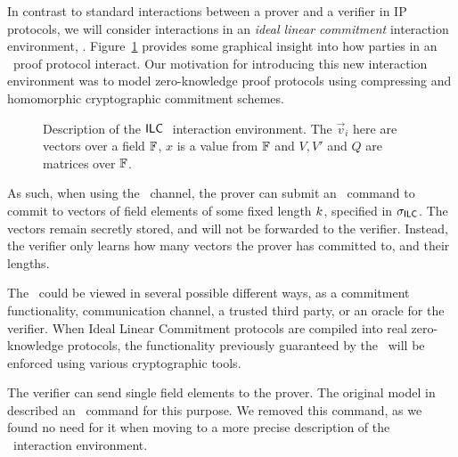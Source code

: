 In contrast to standard interactions between a prover and a verifier in IP protocols, we will consider interactions in an \emph{ideal linear commitment} interaction environment, \ILC. Figure~\ref{ILCSyntaxFigure11} provides some graphical insight into how parties in an \ILC\ proof protocol interact. Our motivation for introducing this new interaction environment was to model zero-knowledge proof protocols using compressing and homomorphic cryptographic commitment schemes.

\begin{figure}[htb]
\caption{Description of the $\mathsf{ILC}~$ interaction environment. The $\vec{v}_i$ here are vectors over a field $\mathbb{F}$, $x$ is a value from $\mathbb{F}$ and $V, V'$ and $Q$ are matrices over $\mathbb{F}$.}\label{ILCSyntaxFigure11}
\end{figure}

As such, when using the \ILC\ channel, the prover can submit an \ILCcommit\ command to commit to
vectors of field elements of some fixed length $k$, specified in $\mathsf{\sigma}_{\mathsf{ILC}}$. The vectors remain secretly stored, and will not be forwarded to the verifier. Instead, the verifier only learns how many vectors the prover has committed to, and their lengths.

The \ILC\ could be viewed in several possible different ways, as a commitment functionality, communication channel, a trusted third party, or an oracle for the verifier. When Ideal Linear Commitment protocols are compiled into real zero-knowledge protocols, the functionality previously guaranteed by the \ILC\ will be enforced using various cryptographic tools.

The verifier can send single field elements to the prover. The original model in \cite{BootleCGGHJ17} described an \ILCsend\ command for this purpose. We removed this command, as we found no need for it when moving to a more precise description of the \ILC\ interaction environment.

